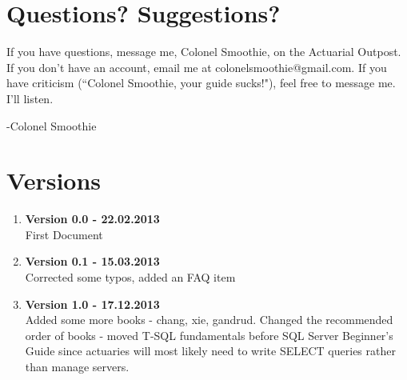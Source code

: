 \documentclass[oneside, titlepage]{article}
\begin{document}
\begin{enumerate}
\end{enumerate}

\section{Questions? Suggestions?}
If you have questions, message me, Colonel Smoothie, on the Actuarial Outpost. If you don't have an account, email me at colonelsmoothie@gmail.com. If you have criticism (``Colonel Smoothie, your guide sucks!"), feel free to message me. I'll listen.

-Colonel Smoothie

\section{Versions}
\begin{enumerate}
\item{\bfseries Version 0.0 - 22.02.2013}\\
First Document
\item{\bfseries Version 0.1 - 15.03.2013}\\
Corrected some typos, added an FAQ item
\item{\bfseries Version 1.0 - 17.12.2013}\\
Added some more books - chang, xie, gandrud. Changed the recommended order of books - moved T-SQL fundamentals before SQL Server Beginner's Guide since actuaries will most likely need to write SELECT queries rather than manage servers.

\end{enumerate}
\end{document}
